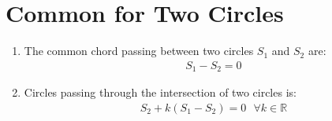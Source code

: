 \documentclass[../main.tex]{subfile}
\begin{document}
        \section{Common for Two Circles}
        \begin{enumerate}
        \item The common chord passing between two circles $S_1$ and $S_2$ are:
        \begin{align}
        S_1-S_2=0
        \end{align}
        \item Circles passing through the intersection of two circles is:
        \begin{align}
        S_2+k(S_1-S_2)=0\text{ }\forall k\in\mathbb{R}
        \end{align}
        \end{enumerate}
\end{document}
